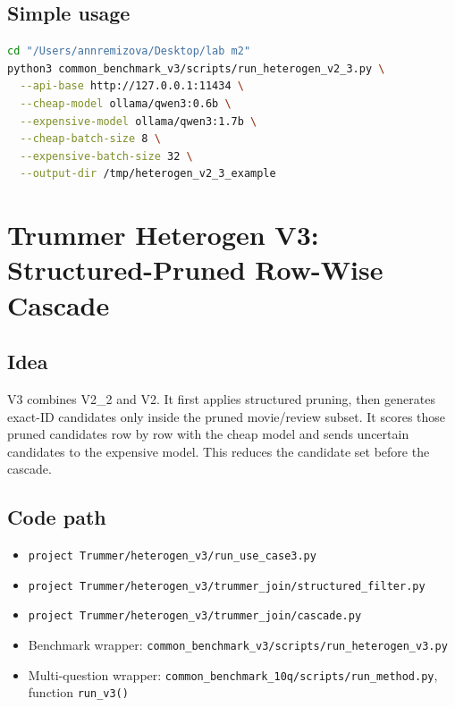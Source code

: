 \documentclass[11pt,oneside]{book}
\begin{document}
\section{Simple usage}
\begin{lstlisting}[language=bash]
cd "/Users/annremizova/Desktop/lab m2"
python3 common_benchmark_v3/scripts/run_heterogen_v2_3.py \
  --api-base http://127.0.0.1:11434 \
  --cheap-model ollama/qwen3:0.6b \
  --expensive-model ollama/qwen3:1.7b \
  --cheap-batch-size 8 \
  --expensive-batch-size 32 \
  --output-dir /tmp/heterogen_v2_3_example
\end{lstlisting}
\chapter{Trummer Heterogen V3: Structured-Pruned Row-Wise Cascade}
\section{Idea}
V3 combines V2\_2 and V2. It first applies structured pruning, then generates exact-ID candidates only inside the pruned movie/review subset. It scores those pruned candidates row by row with the cheap model and sends uncertain candidates to the expensive model. This reduces the candidate set before the cascade.
\section{Code path}
\begin{itemize}
\item \texttt{project Trummer/heterogen\_v3/run\_use\_case3.py}
\item \texttt{project Trummer/heterogen\_v3/trummer\_join/structured\_filter.py}
\item \texttt{project Trummer/heterogen\_v3/trummer\_join/cascade.py}
\item Benchmark wrapper: \texttt{common\_benchmark\_v3/scripts/run\_heterogen\_v3.py}
\item Multi-question wrapper: \texttt{common\_benchmark\_10q/scripts/run\_method.py},
function \texttt{run\_v3()}
\end{itemize}
\end{document}
